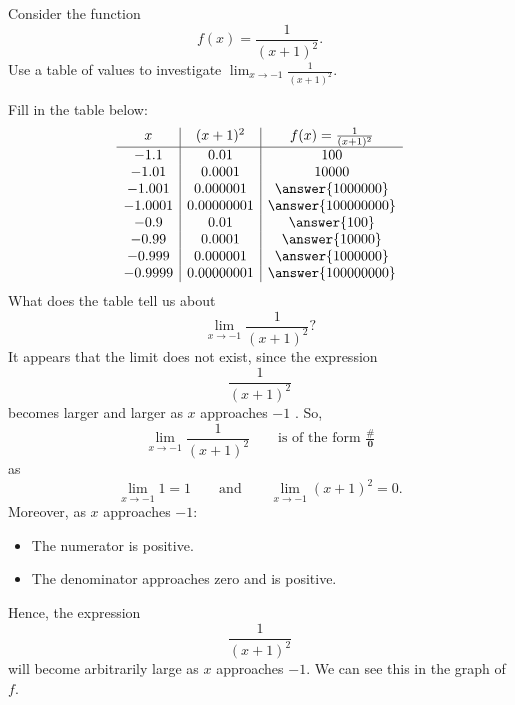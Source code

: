 \documentclass{ximera}
\begin{document}
\begin{example}
Consider the function
  \[
  f(x) = \frac{1}{(x+1)^2}.
  \]
  Use a table of values to investigate $\lim_{x\to -1} \frac{1}{(x+1)^2}$.
  \begin{explanation}
    Fill in the table below:
    \[
    \begin{array}{c|c|c}
      x & (x+1)^{2} & f(x) = \frac{1}{(x+1)^2}\\ \hline
      -1.1    & 0.01       & 100 \\
      -1.01   & 0.0001     & 10000 \\
      -1.001  & 0.000001   & \answer{1000000} \\
      -1.0001 & 0.00000001 & \answer{100000000} \\
      -0.9    & 0.01       & \answer{100} \\
      -0.99   & 0.0001     & \answer{10000} \\
      -0.999  & 0.000001   & \answer{1000000} \\
      -0.9999 & 0.00000001 & \answer{100000000} \\
    \end{array}
    \]
    What does the table tell us about 
    \[
    \lim_{x\to -1} \frac{1}{(x+1)^2}?
    \]
    It appears that the limit  does not exist, since the expression
    \[
    \frac{1}{(x+1)^2}
    \]
    becomes larger and larger as  $x$ approaches $-1$ . So,
    \[
    \lim_{x\to -1} \frac{1}{(x+1)^2}\qquad\text{is of the form }\boldsymbol{\tfrac{\#}{0}}
    \]
    as
    \[
    \lim_{x\to -1} 1 = 1 \qquad\text{and}\qquad \lim_{x\to -1}(x+1)^2 = 0.
    \]
    Moreover, as $x$ approaches $-1$:
    \begin{itemize}
    \item The numerator is positive.
    \item The denominator approaches zero and is positive.
    \end{itemize}
    Hence, the expression
    \[
    \frac{1}{(x+1)^2}
    \]
    will become arbitrarily large as $x$ approaches $-1$.  We can see this
    in the graph of $f$.
    \begin{image}
    \end{image}
  \end{explanation}
\end{example}
\end{document}
